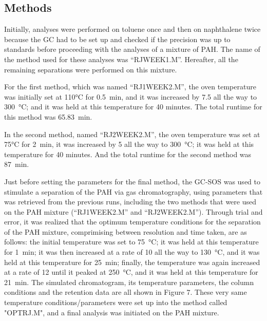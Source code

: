 \documentclass[a4paper, 12pt]{article}
\begin{document}
\subsection{Methods}
Initially, analyses were performed on toluene once and then on naphthalene twice because the GC had to be set up and checked if the precision was up to standards before proceeding with the analyses of a mixture of PAH. The name of the method used for these analyses was ``RJWEEK1.M''. Hereafter, all the remaining separations were performed on this mixture.

For the first method, which was named ``RJ1WEEK2.M'', the oven temperature was initially set at \ang{110}\si{C} for \SI{0.5}{min}, and it was increased by \SI{7.5}{} all the way to \SI{300}{\degreeCelsius}; and it was held at this temperature for 40 minutes. The total runtime for this method was \SI{65.83}{\minute}. 

In the second method, named ``RJ2WEEK2.M'', the oven temperature was set at \ang{75}\si{C} for \SI{2}{min}, it was increased by \SI{5}{} all the way to \SI{300}{\degreeCelsius}; it was held at this temperature for 40 minutes. And the total runtime for the second method was \SI{87}{\minute}. 

Just before setting the parameters for the final method, the GC-SOS\textsuperscript{\textregistered} was used to stimulate a separation of the PAH via gas chromatography, using parameters that was retrieved from the previous runs, including the two methods that were used on the PAH mixture (``RJ1WEEK2.M'' and ``RJ2WEEK2.M''). Through trial and error, it was realized that the optimum temperature conditions for the separation of the PAH mixture, comprimising between resolution and time taken, are as follows: the initial temperature was set to \SI{75}{\degreeCelsius}; it was held at this temperature for \SI{1}{min}; it was then increased at a rate of \SI{10}{} all the way to \SI{130}{\degreeCelsius}, and it was held at this temperature for \SI{25}{min}; finally, the temperature was again increased at a rate of \SI{12}{} until it peaked at \SI{250}{\degreeCelsius}, and it was held at this temperature for \SI{21}{min}. The simulated chromatogram, its temperature parameters, the column conditions and the retention data are all shown in Figure 7. These very same temperature conditions/parameters were set up into the method called "OPTRJ.M", and a final analysis was initiated on the PAH mixture.
\end{document}
